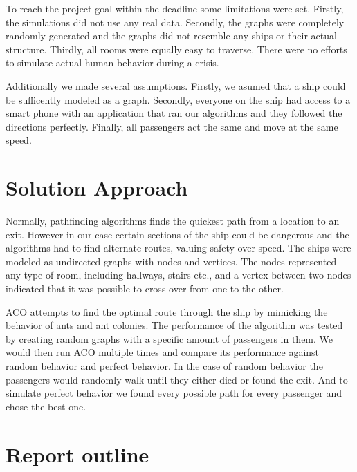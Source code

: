 To reach the project goal within the deadline some limitations were set. Firstly, the simulations did not use 
any real data. Secondly, the graphs were completely randomly generated and the graphs did not resemble
any ships or their actual structure. Thirdly, all rooms were equally easy to traverse. There were no efforts
to simulate actual human behavior during a crisis.

Additionally we made several assumptions. Firstly, we asumed that a ship could be sufficently modeled
as a graph. Secondly, everyone on the ship had access to a smart phone with an application that ran our
algorithms and they followed the directions perfectly. Finally, all passengers act the same and move at
the same speed.

\section{Solution Approach}

Normally, pathfinding algorithms finds the quickest path from a location to an 
exit. However in our case certain sections of the ship could be dangerous and the algorithms 
had to find alternate routes, valuing safety over speed. The ships were modeled as undirected
graphs with nodes and vertices. The nodes represented any type of room, including
hallways, stairs etc., and a vertex between two nodes indicated that it was possible to
cross over from one to the other.

ACO attempts to find the optimal route through the ship by mimicking the behavior of ants and ant colonies. 
The performance of the algorithm was tested by creating random graphs with a specific amount of
passengers in them. We would then run ACO multiple times and compare its performance against
random behavior and perfect behavior. In the case of random behavior the passengers would randomly
walk until they either died or found the exit. And to simulate perfect behavior we found every possible
path for every passenger and chose the best one.

\section{Report outline}
